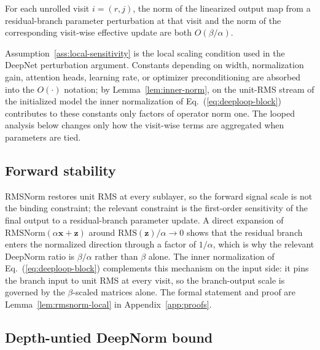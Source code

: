 \documentclass[11pt]{airesearch}
\begin{document}
\begin{assumption}
\label{ass:local-sensitivity}
For each unrolled visit $i=(r,j)$, the norm of the linearized output map from a
residual-branch parameter perturbation at that visit and the norm of the corresponding visit-wise effective update are both $O(\beta/\alpha)$.
\end{assumption}

Assumption~\ref{ass:local-sensitivity} is the local scaling condition used in
the DeepNet perturbation argument. Constants depending on width, normalization
gain, attention heads, learning rate, or optimizer preconditioning are absorbed
into the $O(\cdot)$ notation; by Lemma~\ref{lem:inner-norm}, on the unit-RMS
stream of the initialized model the inner
normalization of Eq.~(\ref{eq:deeploop-block}) contributes to these constants
only factors of operator norm one. The looped analysis below changes
only how the visit-wise terms are aggregated when parameters are tied.

\subsection{Forward stability}
\label{sec:method:fwd}

RMSNorm restores unit RMS at every sublayer, so the forward signal scale is
not the binding constraint; the relevant constraint is the first-order
sensitivity of the final output to a residual-branch parameter update. A
direct expansion of $\mathrm{RMSNorm}(\alpha\mathbf{x}+\mathbf{z})$ around
$\mathrm{RMS}(\mathbf{z})/\alpha\to 0$ shows that the residual branch enters
the normalized direction through a factor of $1/\alpha$, which is why the
relevant DeepNorm ratio is $\beta/\alpha$ rather than $\beta$ alone. The
inner normalization of Eq.~(\ref{eq:deeploop-block}) complements this
mechanism on the input side: it pins the branch input to unit RMS at every
visit, so the branch-output scale is governed by the $\beta$-scaled matrices
alone. The
formal statement and proof are
Lemma~\ref{lem:rmsnorm-local} in Appendix~\ref{app:proofs}.

\subsection{Depth-untied DeepNorm bound}
\label{sec:method:bwd}
\end{document}
